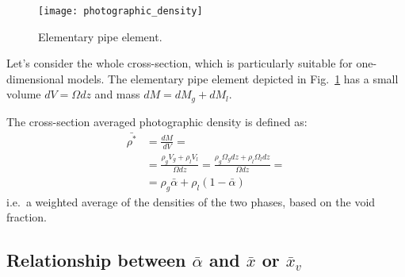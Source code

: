 \begin{figure}[htp]
    \centering
    \texttt{[image: photographic\_density]}
    \caption{Elementary pipe element.\label{fig:photographic_density_element}}
\end{figure}

Let's consider the whole cross-section, which is particularly suitable for
one-dimensional models. The elementary pipe element depicted in
Fig.~\ref{fig:photographic_density_element} has a small volume $dV=\Omega dz$
and mass $dM=dM_g+dM_l$.

The cross-section averaged photographic density is defined as:
\begin{align*}
    \bar{\rho^*} &= \frac{dM}{dV} = \\
    &= \frac{\rho_g V_g + \rho_l V_l}{\Omega dz} = \frac{\rho_g \Omega_g dz + \rho_l \Omega_l dz}{\Omega dz} = \\
    &= \rho_g \bar{\alpha} + \rho_l (1-\bar{\alpha})
\end{align*}
i.e.\ a weighted average of the densities of the two phases, based on the void
fraction.

\subsection{Relationship between $\bar{\alpha}$ and $\bar{x}$ or $\bar{x}_v$}

